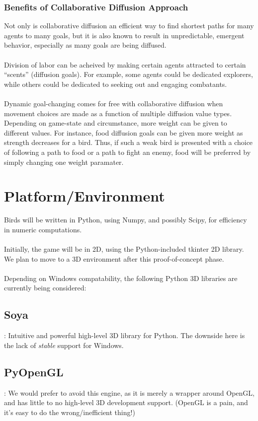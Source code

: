 \documentclass{article}
\begin{document}
\subsubsection{Benefits of Collaborative Diffusion Approach}
Not only is collaborative diffusion an efficient way to find shortest paths for many agents to many goals, but it is also known to result in unpredictable, emergent behavior, especially as many goals are being diffused.
\\\\
Division of labor can be acheived by making certain agents attracted to certain ``scents'' (diffusion goals).  For example, some agents could be dedicated explorers, while others could be dedicated to seeking out and engaging combatants.
\\\\
Dynamic goal-changing comes for free with collaborative diffusion when movement choices are made as a function of multiple diffusion value types.  Depending on game-state and circumstance, more weight can be given to different values.  For instance, food diffusion goals can be given more weight as strength decreases for a bird.  Thus, if such a weak bird is presented with a choice of following a path to food or a path to fight an enemy, food will be preferred by simply changing one weight paramater.

\section{Platform/Environment}
Birds will be written in Python, using Numpy, and possibly Scipy, for efficiency in numeric computations.
\\\\
Initially, the game will be in 2D, using the Python-included tkinter 2D library.  We plan to move to a 3D environment after this proof-of-concept phase.\\\\
Depending on Windows compatability, the following Python 3D libraries are currently being considered:\\
\subsection{Soya}: Intuitive and powerful high-level 3D library for Python.  The downside here is the lack of \textit{stable} support for Windows.\\
\subsection{PyOpenGL}: We would prefer to avoid this engine, as it is merely a wrapper around OpenGL, and has little to no high-level 3D development support. (OpenGL is a pain, and it's easy to do the wrong/inefficient thing!)\\
\end{document}
